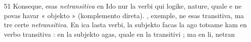 \begin{VUpage}[55]{51}
Konseque, esas \textit{netransitiva} en Ido nur la verbi qui logike,\nl
nature, quale  e  ne povas havar « objekto »\nl
(komplemento direta). \nl
{}\cc
{}, exemple, ne esas transitiva, ma tre certe \textit{netransitiva.}\nl
En ica lasta verbi, la subjekto facas la ago totsame kam en\nl
verbo transitiva : en  la subjekto agas,\nl
quale en la transitivi ; ma en li, netran\cc
\end{VUpage}

